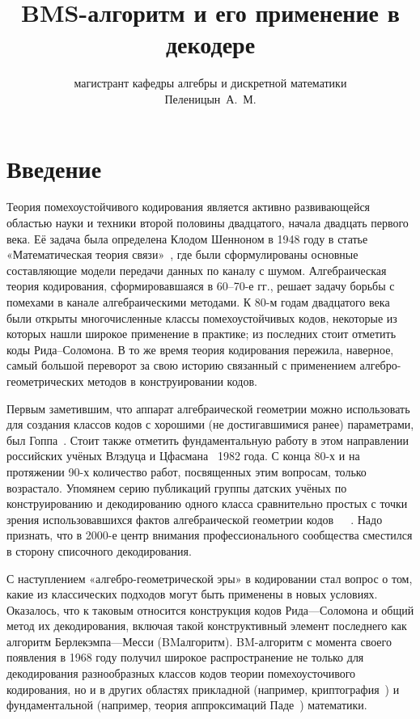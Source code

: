 \documentclass[14pt]{extarticle}
\title{BMS-алгоритм и его применение в декодере}
\author{магистрант кафедры алгебры и дискретной математики\\Пеленицын~А.~М.}
\date{}
\begin{document}
\setcounter{page}{2}
\tableofcontents

\section*{Введение}
 
Теория помехоустойчивого кодирования является активно развивающейся областью
науки и техники второй половины двадцатого, начала двадцать первого века. Её
задача была определена Клодом Шенноном в 1948 году в статье «Математическая
теория связи»~\cite{Shannon63ru}, где были сформулированы основные составляющие
модели передачи данных по каналу с шумом. Алгебраическая теория кодирования,
сформировавшаяся в 60–70-е гг.,
решает задачу борьбы с помехами в канале алгебраическими методами. К 80-м годам
двадцатого века были открыты многочисленные классы помехоустойчивых кодов,
некоторые из которых нашли широкое применение в практике; из последних стоит
отметить коды Рида–Соломона. В то же время теория кодирования пережила,
наверное, самый большой переворот за свою историю связанный с применением
алгебро-геометрических методов в конструировании кодов.

Первым заметившим, что аппарат алгебраической геометрии можно использовать для
создания классов кодов с хорошими (не достигавшимися ранее) параметрами, был
Гоппа~\cite{Goppa77}. Стоит также отметить фундаментальную работу в этом
направлении российских учёных Влэдуца и Цфасмана~\cite{Tsfasman82} 1982 года. С
конца 80-х и на протяжении 90-х количество работ, посвященных этим вопросам,
только возрастало. Упомянем серию публикаций группы датских учёных по
конструированию и декодированию одного класса сравнительно простых с точки
зрения использовавшихся фактов алгебраической геометрии
кодов~\cite{Justesen89}~\cite{Justesen92}~\cite{Sakata95}. Надо признать, что в
2000-е центр внимания профессионального сообщества сместился в сторону
списочного декодирования.

С наступлением «алгебро-геометрической эры» в кодировании стал вопрос о том,
какие из классических подходов могут быть применены в новых условиях. Оказалось,
что к таковым относится конструкция кодов Рида—Соломона и общий метод их
декодирования, включая такой конструктивный элемент последнего как алгоритм
Берлекэмпа—Месси (BM\nbdash алгоритм). BM-алгоритм с момента своего появления в 1968
году получил широкое распространение не только для декодирования разнообразных
классов кодов теории помехоусточивого кодирования, но и в других областях
прикладной (например, криптография~\cite{Alferov05}) и фундаментальной
(например, теория аппроксимаций Паде~\cite{Gashkov04}) математики.
\end{document}
